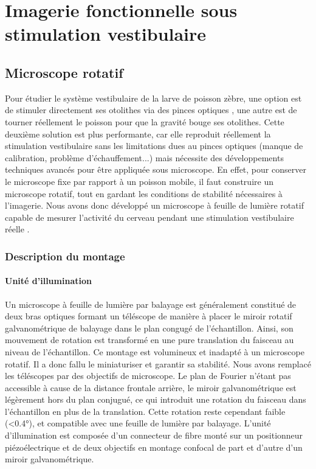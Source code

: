 \chapter{Imagerie fonctionnelle sous stimulation vestibulaire}


\section{Microscope rotatif}

Pour étudier le système vestibulaire de la larve de poisson zèbre, une option est de stimuler directement ses otolithes via des pinces optiques \cite{favre-bulle_optical_2017}, une autre est de tourner réellement le poisson pour que la gravité bouge ses otolithes. Cette deuxième solution est plus performante, car elle reproduit réellement la stimulation vestibulaire sans les limitations dues au pinces optiques (manque de calibration, problème d'échauffement...) mais nécessite des développements techniques avancés pour être appliquée sous microscope. En effet, pour conserver le microscope fixe par rapport à un poisson mobile, il faut construire un microscope rotatif, tout en gardant les conditions de stabilité nécessaires à l'imagerie. Nous avons donc développé un microscope à feuille de lumière rotatif capable de mesurer l'activité du cerveau pendant une stimulation vestibulaire réelle \cite{migault_whole-brain_2018}.

\subsection{Description du montage}

\subsubsection{Unité d'illumination}

Un microscope à feuille de lumière par balayage est généralement constitué de deux bras optiques formant un téléscope de manière à placer le miroir rotatif galvanométrique de balayage dans le plan congugé de l'échantillon. Ainsi, son mouvement de rotation est transformé en une pure translation du faisceau au niveau de l'échantillon. Ce montage est volumineux et inadapté à un microscope rotatif. Il a donc fallu le miniaturiser et garantir sa stabilité. Nous avons remplacé les téléscopes par des objectifs de microscope. Le plan de Fourier n'étant pas accessible à cause de la distance frontale arrière, le miroir galvanométrique est légèrement hors du plan conjugué, ce qui introduit une rotation du faisceau dans l'échantillon en plus de la translation. Cette rotation reste cependant faible (<0.4°), et compatible avec une feuille de lumière par balayage.  
L'unité d'illumination est composée d'un connecteur de fibre monté sur un positionneur piézoélectrique et de deux objectifs en montage confocal de part et d'autre d'un miroir galvanométrique. 

